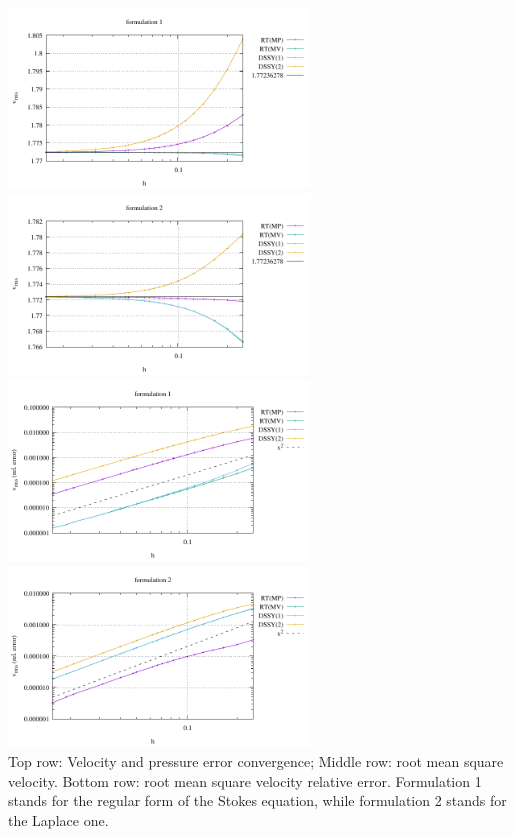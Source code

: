 \begin{itemize}
\begin{center}
\includegraphics[width=8cm]{python_codes/fieldstone_77/results/db2D/vrms_form1}
\includegraphics[width=8cm]{python_codes/fieldstone_77/results/db2D/vrms_form2}\\
\includegraphics[width=8cm]{python_codes/fieldstone_77/results/db2D/vrms_form1_relerror}
\includegraphics[width=8cm]{python_codes/fieldstone_77/results/db2D/vrms_form2_relerror}\\
{\captionfont Top row: Velocity and pressure error convergence; 
Middle row: root mean square velocity. 
Bottom row: root mean square velocity relative error.
Formulation 1 stands for the regular form of the 
Stokes equation, while formulation 2 stands for the Laplace one.}
\end{center}


\end{itemize}
